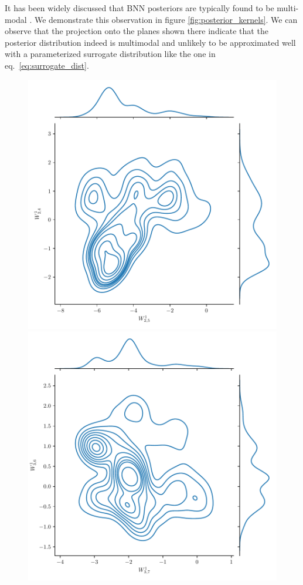 It has been widely discussed that BNN posteriors are typically found to be multi-modal \cite{google_bnn_posteriors}. We demonstrate this observation in figure \ref{fig:posterior_kernels}.
We can observe that the projection onto the planes shown there indicate that the posterior distribution indeed is multimodal
and unlikely to be approximated well with a parameterized surrogate distribution like the one in eq.~\eqref{eq:surrogate_dist}.

\begin{figure}
    \centering
    \includegraphics[scale=0.7]{figures/posterior_distribution/posterior_weights1.pdf}
    \includegraphics[scale=0.7]{figures/posterior_distribution/posterior_weights2.pdf}

\end{figure}
